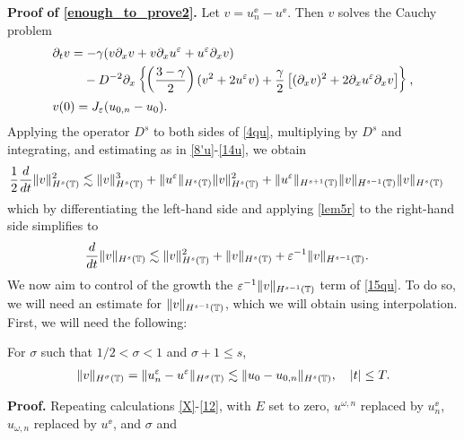 \textbf{Proof of \eqref{enough_to_prove2}.} Let $v = u^\ee_n - u^\ee$. Then 
$v$ solves the Cauchy problem
\begin{align}
\label{4qu}
& \p_t v  =  -\gamma (v \p_x v + v \p_x u^\ee + u^\ee \p_x v)  \\
& \phantom{ \p_t v  =} - D^{-2} \p_x \left\{ \left (\frac{3-\gamma}{2} \right )(v^2 +
2u^\ee v) + \frac{\gamma}{2}\left[ (\p_x v)^2 + 2 \p_x u^\ee \p_x v \right]
\right\}, \notag
\\
& v(0) =J_\ee(u_{0,n} - u_0).
\label{5qu}
\end{align}
Applying the operator $D^s$ to both sides of \eqref{4qu}, multiplying by
$D^s$ and integrating, and estimating as in \eqref{8'u}-\eqref{14u}, we 
obtain
%
%
\begin{equation*}
\begin{split}
\frac{1}{2}\frac{d}{dt}\|v\|_{H^{s}(\mathbb{T})}^2
& \lesssim \|v\|_{H^s(\mathbb{T})}^3 + \|u^\varepsilon\|_{H^s(\mathbb{T})}
\|v\|_{H^s(\mathbb{T})}^2
 + \|u^\varepsilon\|_{H^{s+1}(\mathbb{T})}
\|v\|_{H^{s-1}(\mathbb{T})} \|v\|_{H^s(\mathbb{T})}
\end{split}
\end{equation*}
%
%
which by differentiating the left-hand side and applying \cref{lem5r} to 
the right-hand side simplifies to
\begin{equation}
\begin{split}
\frac{d}{dt}\|v\|_{H^{s}(\mathbb{T})}
& \lesssim \|v\|_{H^s(\mathbb{T})}^2 + \|v\|_{H^s(\mathbb{T})}
+ \varepsilon^{-1}
\|v\|_{H^{s-1}(\mathbb{T})}.
\label{15qu}
\end{split}
\end{equation}
%
%
We now aim to control of the growth the $\varepsilon^{-1}
\|v\|_{H^{s-1}(\mathbb{T})}$ term of \eqref{15qu}. To do so, we will need an estimate for
$\|v\|_{H^{s-1}(\mathbb{T})}$, which we will obtain using interpolation. First, 
we will need the following:
%
%
%
%
\begin{proposition}
\label{prop:left}
For $\sigma$ such that $1/2 < \sigma < 1$ and $\sigma + 1 \le s$, 
%
%
\begin{equation}
\label{prop:6rq}
\begin{split}
\|v\|_{H^{\sigma}(\mathbb{T})} = \|u^\varepsilon_n - u^\varepsilon\|_{H^\sigma(\mathbb{T})}
\lesssim \|u_0 - u_{0,n} \|_{H^s(\mathbb{T})}, \quad |t| \le T.
\end{split}
\end{equation}
%
%
\end{proposition}
%
%
%
\textbf{Proof.}
Repeating calculations \eqref{X}-\eqref{12}, with $E$ set to zero, 
$u^{\omega,n}$
replaced by $u^\ee_n$, $u_{\omega,n}$ replaced by $u^\ee$, and $\sigma$ and 
